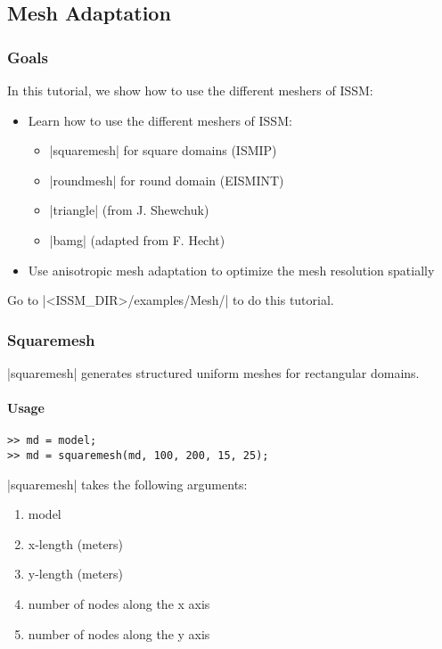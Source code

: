 
\subsection{Mesh Adaptation} \label{sec:using-issm-tutorials-mesh}
\subsubsection{Goals} %
In this tutorial, we show how to use the different meshers of ISSM:
\begin{itemize}
	\item Learn how to use the different meshers of ISSM:
		\begin{itemize}
			\item \lstinlinebg|squaremesh| for square domains (ISMIP)
			\item \lstinlinebg|roundmesh| for round domain (EISMINT)
			\item \lstinlinebg|triangle| (from J. Shewchuk)
			\item \lstinlinebg|bamg| (adapted from F. Hecht)
		\end{itemize}
	\item Use anisotropic mesh adaptation to optimize the mesh resolution spatially
\end{itemize}
Go to \lstinlinebg|<ISSM_DIR>/examples/Mesh/| to do this tutorial.

\subsubsection{Squaremesh}%
\lstinlinebg|squaremesh| generates structured uniform meshes for rectangular domains.
\paragraph{Usage}%
\begin{lstlisting}
>> md = model;
>> md = squaremesh(md, 100, 200, 15, 25);
\end{lstlisting}
\lstinlinebg|squaremesh| takes the following arguments:
\begin{enumerate}
	\item model
	\item x-length (meters)
	\item y-length (meters)
	\item number of nodes along the x axis
	\item number of nodes along the y axis
\end{enumerate}

